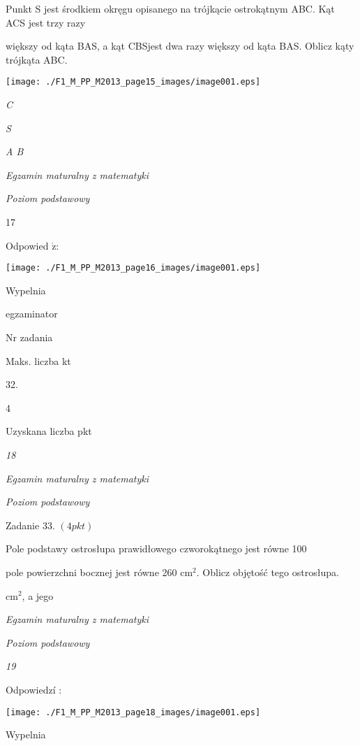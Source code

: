 \documentclass[a4paper,12pt]{article}
\begin{document}
Punkt S jest środkiem okręgu opisanego na trójkącie ostrokątnym ABC. Kąt ACS jest trzy razy

większy od kąta BAS, a kąt CBSjest dwa razy większy od kąta BAS. Oblicz kąty trójkąta ABC.
\begin{center}
\texttt{[image: ./F1\_M\_PP\_M2013\_page15\_images/image001.eps]}
\end{center}
{\it C}

{\it S}

{\it A  B}





{\it Egzamin maturalny z matematyki}

{\it Poziom podstawowy}

17

Odpowied $\acute{\mathrm{z}}$:
\begin{center}
\texttt{[image: ./F1\_M\_PP\_M2013\_page16\_images/image001.eps]}
\end{center}
Wypelnia

egzaminator

Nr zadania

Maks. liczba kt

32.

4

Uzyskana liczba pkt





{\it 18}

{\it Egzamin maturalny z matematyki}

{\it Poziom podstawowy}

Zadanie 33. $(4pkt)$

Pole podstawy ostrosłupa prawidłowego czworokątnego jest równe 100

pole powierzchni bocznej jest równe 260 $\mathrm{c}\mathrm{m}^{2}$. Oblicz objętość tego ostrosłupa.

$\mathrm{c}\mathrm{m}^{2}$, a jego





{\it Egzamin maturalny z matematyki}

{\it Poziom podstawowy}

{\it 19}

Odpowiedzí :
\begin{center}
\texttt{[image: ./F1\_M\_PP\_M2013\_page18\_images/image001.eps]}
\end{center}
Wypelnia
\end{document}

